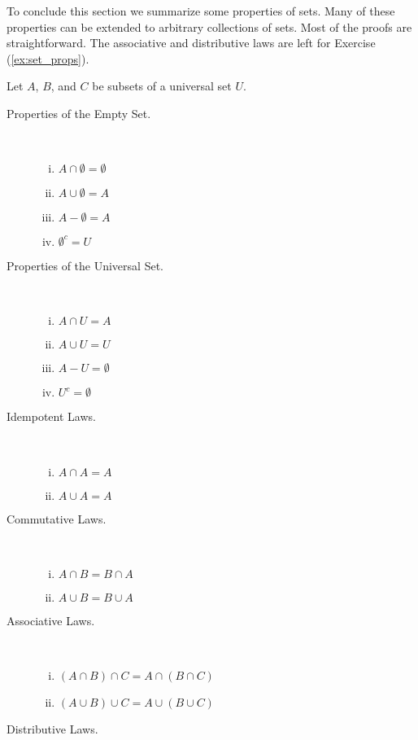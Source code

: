 To conclude this section we summarize some properties of sets. Many of these properties can be extended to arbitrary collections of sets. Most of the proofs are straightforward. The associative and distributive laws are left for Exercise (\ref{ex:set_props}). 

\newpage
\begin{theorem} Let $A$, $B$, and $C$ be subsets of a universal set $U$. 
\begin{multicols}{2}
\begin{description}
\item[Properties of the Empty Set.]  ~
	\begin{enumerate}[i.]
	\item $A \cap \emptyset = \emptyset$ 
	\item $A \cup \emptyset = A$ 
	\item $A-\emptyset = A$ 
	\item $\emptyset^c = U$
	\end{enumerate}
\item[Properties of the Universal Set.] ~
	\begin{enumerate}[i.]
	\item $A \cap U = A$ 
	\item $A \cup U = U$ 
	\item $A-U = \emptyset$ 
	\item $U^c = \emptyset$  
	\end{enumerate}
\item[Idempotent Laws.] ~
	\begin{enumerate}[i.]
	\item  $A \cap A = A$ 
	\item $A \cup A = A$ 
	\end{enumerate} 
	\vspace{24pt}
\item[Commutative Laws.] ~
	\begin{enumerate}[i.]
	\item $A \cap B  = B \cap A$
	\item $A \cup B = B \cup A$  
	\end{enumerate}
\item[Associative Laws.] ~
	\begin{enumerate}[i.]
	\item $(A \cap B) \cap C = A \cap (B \cap C)$ 
	\item $(A \cup B) \cup C = A \cup (B \cup C)$ 
	\end{enumerate}
\item[Distributive Laws.] ~

\end{description}
\end{multicols}
\end{theorem}
